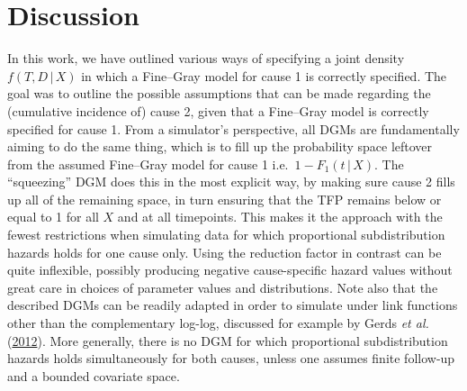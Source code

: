 \documentclass[
  letterpaper,
  DIV=11,
  numbers=noendperiod]{scrreprt}
\newcommand{\given}{\,|\,}
\begin{document}
\hypertarget{discussion}{%
\section{Discussion}\label{discussion}}

In this work, we have outlined various ways of specifying a joint
density \(f(T, D \given X)\) in which a Fine--Gray model for cause 1 is
correctly specified. The goal was to outline the possible assumptions
that can be made regarding the (cumulative incidence of) cause 2, given
that a Fine--Gray model is correctly specified for cause 1. From a
simulator's perspective, all DGMs are fundamentally aiming to do the
same thing, which is to fill up the probability space leftover from the
assumed Fine--Gray model for cause 1 i.e.~\(1 - F_1(t \given X)\). The
``squeezing'' DGM does this in the most explicit way, by making sure
cause 2 fills up all of the remaining space, in turn ensuring that the
TFP remains below or equal to 1 for all \(X\) and at all timepoints.
This makes it the approach with the fewest restrictions when simulating
data for which proportional subdistribution hazards holds for one cause
only. Using the reduction factor in contrast can be quite inflexible,
possibly producing negative cause-specific hazard values without great
care in choices of parameter values and distributions. Note also that
the described DGMs can be readily adapted in order to simulate under
link functions other than the complementary log-log, discussed for
example by Gerds \emph{et al.}
(\protect\hyperlink{ref-gerdsAbsoluteRiskRegression2012a}{2012}). More
generally, there is no DGM for which proportional subdistribution
hazards holds simultaneously for both causes, unless one assumes finite
follow-up and a bounded covariate space.
\end{document}
